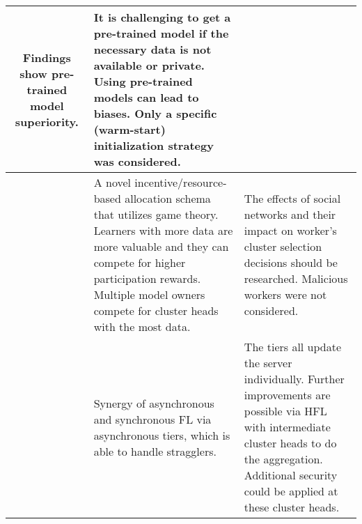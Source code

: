 \begin{changemargin}{-2cm}{0cm}
\begin{tabular}{|c||m{0.4\paperwidth}|m{0.4\paperwidth}|}
            Findings show pre-trained model superiority.
            &
            It is challenging to get a pre-trained model if the necessary data is not available or private.
            Using pre-trained models can lead to biases.
            Only a specific (warm-start) initialization strategy was considered.
        \\
        \hline
            \cite{paper:decentralized_edge_intelligence_dynamic_resource_allocation_framework_hfl}
            &
            A novel incentive/resource-based allocation schema that utilizes game theory.
            Learners with more data are more valuable and they can compete for higher participation rewards.
            Multiple model owners compete for cluster heads with the most data.
            &
            The effects of social networks and their impact on worker's cluster selection decisions should be researched.
            Malicious workers were not considered.
        \\
        \hline
            \cite{paper:fedat_high_performance_communication_efficient_fl_with_asynch_tiers}
            &
            Synergy of asynchronous and synchronous FL via asynchronous tiers, which is able to handle stragglers.
            &
            The tiers all update the server individually.
            Further improvements are possible via HFL with intermediate cluster heads to do the aggregation.
            Additional security could be applied at these cluster heads.
        \\
        \hline
    \end{tabular}
    \label{table:main_fl_research_table}
\end{changemargin}
